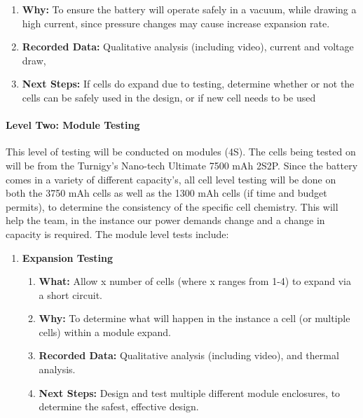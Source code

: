 \documentclass[main.tex]{subfiles}
\begin{document}
\begin{enumerate}
\begin{enumerate}
            \item \textbf{Why: }To ensure the battery will operate safely in a vacuum, while drawing a high current, since pressure changes may cause increase expansion rate.
            \item \textbf{Recorded Data: }Qualitative analysis (including video), current and voltage draw,
            \item \textbf{Next Steps: }If cells do expand due to testing, determine whether or not the cells can be safely used in the design, or if new cell needs to be used
        \end{enumerate}
    \end{enumerate}
    \paragraph{Level Two: Module Testing}
    This level of testing will be conducted on modules (4S). The cells being tested on will be from the Turnigy’s Nano-tech Ultimate  7500 mAh 2S2P. Since the battery comes in a variety of different capacity’s, all cell level testing will be done on both the 3750 mAh cells as well as the 1300 mAh cells (if time and budget permits), to determine the consistency of the specific cell chemistry. This will help the team, in the instance our power demands change and a change in capacity is required. The module level tests include:
    \begin{enumerate}
        \item \textbf{Expansion Testing}
        \begin{enumerate}
            \item \textbf{What: }Allow x number of cells (where x ranges from 1-4) to expand via a short circuit.
            \item \textbf{Why: }To determine what will happen in the instance a cell (or multiple cells) within a module expand.
            \item \textbf{Recorded Data: }Qualitative analysis (including video), and thermal analysis.
            \item \textbf{Next Steps: }Design and test multiple different module enclosures, to determine the safest, effective design.
        \end{enumerate}
    \end{enumerate}
\end{document}
